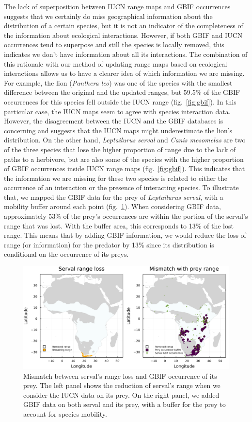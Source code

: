 \documentclass[10pt,oneside]{article}
\makeatletter
\def\maxwidth{\ifdim\Gin@nat@width>\linewidth\linewidth
\else\Gin@nat@width\fi}
\let\Oldincludegraphics\includegraphics
\renewcommand{\includegraphics}[1]{\Oldincludegraphics[width=\maxwidth]{#1}}
\makeatother
\begin{document}
The lack of superposition between IUCN range maps and GBIF occurrences
suggests that we certainly do miss geographical information about the
distribution of a certain species, but it is not an indicator of the
completeness of the information about ecological interactions. However,
if both GBIF and IUCN occurrences tend to superpose and still the
species is locally removed, this indicates we don't have information
about all its interactions. The combination of this rationale with our
method of updating range maps based on ecological interactions allows us
to have a clearer idea of which information we are missing. For example,
the lion (\emph{Panthera leo}) was one of the species with the smallest
difference between the original and the updated ranges, but 59.5\% of
the GBIF occurrences for this species fell outside the IUCN range
(fig.~\ref{fig:gbif}). In this particular case, the IUCN maps seem to
agree with species interaction data. However, the disagreement between
the IUCN and the GBIF databases is concerning and suggests that the IUCN
maps might underestimate the lion's distribution. On the other hand,
\emph{Leptailurus serval} and \emph{Canis mesomelas} are two of the
three species that lose the higher proportion of range due to the lack
of paths to a herbivore, but are also some of the species with the
higher proportion of GBIF occurrences inside IUCN range maps
(fig.~\ref{fig:gbif}). This indicates that the information we are
missing for these two species is related to either the occurrence of an
interaction or the presence of interacting species. To illustrate that,
we mapped the GBIF data for the prey of \emph{Leptailurus serval}, with
a mobility buffer around each point (fig.~\ref{fig:serval}). When
considering GBIF data, approximately 53\% of the prey's occurrences are
within the portion of the serval's range that was lost. With the buffer
area, this corresponds to 13\% of the lost range. This means that by
adding GBIF information, we would reduce the loss of range (or
information) for the predator by 13\% since its distribution is
conditional on the occurrence of its preys.

\begin{figure}
\hypertarget{fig:serval}{%
\centering
\includegraphics{figures/serval_mismatch_combined.png}
\caption{Mismatch between serval's range loss and GBIF occurrence of its
prey. The left panel shows the reduction of serval's range when we
consider the IUCN data on its prey. On the right panel, we added GBIF
data on both serval and its prey, with a buffer for the prey to account
for species mobility.}\label{fig:serval}
}
\end{figure}
\end{document}
